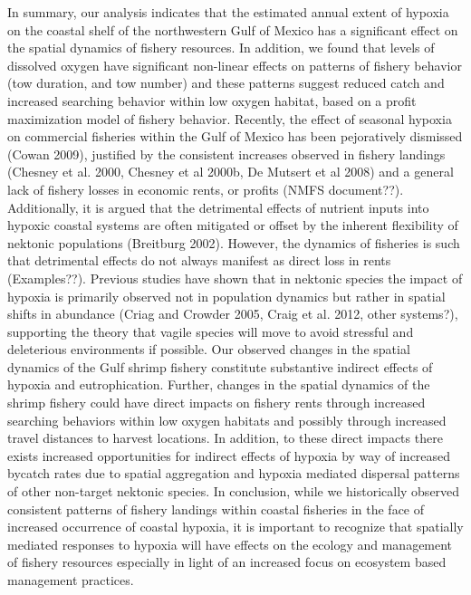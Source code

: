 \documentclass[10pt]{article}
\begin{document}
In summary, our analysis indicates that the estimated annual extent of hypoxia on the coastal shelf of the northwestern Gulf of Mexico has a significant effect on the spatial dynamics of fishery resources.  In addition, we found that levels of dissolved oxygen have significant non-linear effects on patterns of fishery behavior (tow duration, and tow number) and these patterns suggest reduced catch and increased searching behavior within low oxygen habitat, based on a profit maximization model of fishery behavior.  Recently, the effect of seasonal hypoxia on commercial fisheries within the Gulf of Mexico has been pejoratively dismissed (Cowan 2009), justified by the consistent increases observed in fishery landings (Chesney et al. 2000, Chesney et al 2000b, De Mutsert et al 2008) and a general lack of fishery losses in economic rents, or profits (NMFS document??).  Additionally, it is argued that the detrimental effects of nutrient inputs into hypoxic coastal systems are often mitigated or offset by the inherent flexibility of nektonic populations (Breitburg 2002).  However, the dynamics of fisheries is such that detrimental effects do not always manifest as direct loss in rents (Examples??).  Previous studies have shown that in nektonic species the impact of hypoxia is primarily observed not in population dynamics but rather in spatial shifts in abundance (Criag and Crowder 2005, Craig et al. 2012, other systems?), supporting the theory that vagile species will move to avoid stressful and deleterious environments if possible.  Our observed changes in the spatial dynamics of the Gulf shrimp fishery constitute substantive indirect effects of hypoxia and eutrophication.  Further, changes in the spatial dynamics of the shrimp fishery could have direct impacts on fishery rents through increased searching behaviors within low oxygen habitats and possibly through increased travel distances to harvest locations.  In addition, to these direct impacts there exists increased opportunities for indirect effects of hypoxia by way of increased bycatch rates due to spatial aggregation and hypoxia mediated dispersal patterns of other non-target nektonic species.  In conclusion, while we historically observed consistent patterns of fishery landings within coastal fisheries in the face of increased occurrence of coastal hypoxia, it is important to recognize that spatially mediated responses to hypoxia will have effects on the ecology and management of fishery resources especially in light of an increased focus on ecosystem based management practices.  
\end{document}
